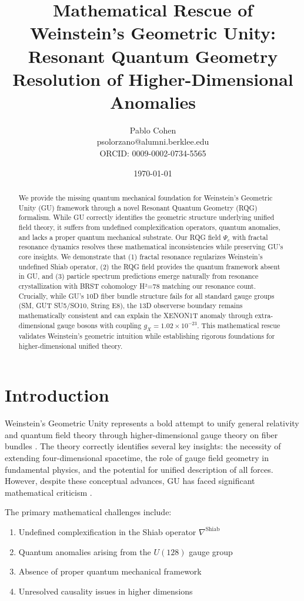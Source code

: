 \documentclass[12pt]{article}
\title{Mathematical Rescue of Weinstein's Geometric Unity: \\
Resonant Quantum Geometry Resolution of Higher-Dimensional Anomalies}
\author{Pablo Cohen\\
\small{psolorzano@alumni.berklee.edu}\\
\small{ORCID: 0009-0002-0734-5565}}
\date{\today}
\begin{document}
\maketitle

\begin{abstract}
We provide the missing quantum mechanical foundation for Weinstein's Geometric Unity (GU) framework through a novel Resonant Quantum Geometry (RQG) formalism. While GU correctly identifies the geometric structure underlying unified field theory, it suffers from undefined complexification operators, quantum anomalies, and lacks a proper quantum mechanical substrate. Our RQG field $\Psi_c$ with fractal resonance dynamics resolves these mathematical inconsistencies while preserving GU's core insights. We demonstrate that (1) fractal resonance regularizes Weinstein's undefined Shiab operator, (2) the RQG field provides the quantum framework absent in GU, and (3) particle spectrum predictions emerge naturally from resonance crystallization with BRST cohomology H²=78 matching our resonance count. Crucially, while GU's 10D fiber bundle structure fails for all standard gauge groups (SM, GUT SU5/SO10, String E8), the 13D observerse boundary remains mathematically consistent and can explain the XENON1T anomaly through extra-dimensional gauge bosons with coupling $g_X = 1.02 \times 10^{-23}$. This mathematical rescue validates Weinstein's geometric intuition while establishing rigorous foundations for higher-dimensional unified theory.
\end{abstract}
\newpage
\section{Introduction}

Weinstein's Geometric Unity represents a bold attempt to unify general relativity and quantum field theory through higher-dimensional gauge theory on fiber bundles \cite{weinstein2013geometric}. The theory correctly identifies several key insights: the necessity of extending four-dimensional spacetime, the role of gauge field geometry in fundamental physics, and the potential for unified description of all forces. However, despite these conceptual advances, GU has faced significant mathematical criticism \cite{nguyen2021critique, easther2021analysis}.

The primary mathematical challenges include:
\begin{enumerate}
    \item Undefined complexification in the Shiab operator $\nabla^{\text{Shiab}}$
    \item Quantum anomalies arising from the $U(128)$ gauge group
    \item Absence of proper quantum mechanical framework
    \item Unresolved causality issues in higher dimensions
\end{enumerate}
\end{document}
